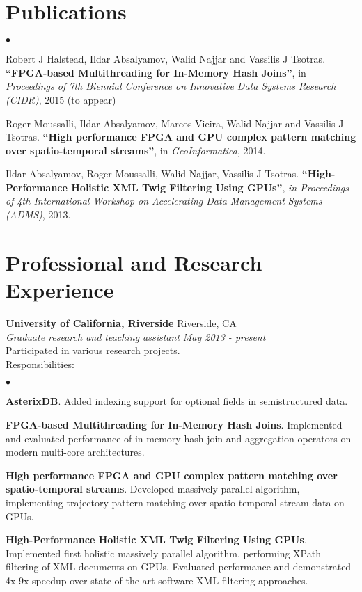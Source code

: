 \documentclass[margin,line]{res}
\newenvironment{list2}{
  \begin{list}{$\bullet$}{%
      \setlength{\itemsep}{0in}
      \setlength{\parsep}{0in} \setlength{\parskip}{0in}
      \setlength{\topsep}{0in} \setlength{\partopsep}{0in} 
      \setlength{\leftmargin}{0.2in}}}{\end{list}}
\begin{document}
\begin{resume}
\section{\sc Publications}
\begin{list2}
	\item Robert J Halstead, Ildar Absalyamov, Walid Najjar and Vassilis J Tsotras. {\bf ``FPGA-based Multithreading for In-Memory Hash Joins''}, in {\it Proceedings of 7th Biennial Conference on Innovative Data Systems Research (CIDR)}, 2015 (to appear)
	\item Roger Moussalli, Ildar Absalyamov, Marcos Vieira, Walid Najjar and Vassilis J Tsotras. {\bf ``High performance FPGA and GPU complex pattern matching over spatio-temporal streams''}, in {\it GeoInformatica}, 2014. 
	\item Ildar Absalyamov, Roger Moussalli, Walid Najjar, Vassilis J Tsotras. {\bf ``High-Performance Holistic XML Twig Filtering Using GPUs''}, { \it in Proceedings of 4th International Workshop on Accelerating Data Management Systems (ADMS)}, 2013.
\end{list2}
% 
% 

\section{\sc Professional and Research Experience}

{\bf University of California, Riverside } \hfill { Riverside, CA } \\
{\em Graduate research and teaching assistant } \hfill {\it May 2013 - present}\\
Participated in various research projects. \\
Responsibilities:
\begin{list2}
	\item {\bf AsterixDB}. Added indexing support for optional fields in semistructured data.
	\item {\bf FPGA-based Multithreading for In-Memory Hash Joins}. Implemented and evaluated performance of in-memory hash join and aggregation operators on modern multi-core architectures.
	\item {\bf High performance FPGA and GPU complex pattern matching over spatio-temporal streams}. Developed massively parallel algorithm, implementing trajectory pattern matching over spatio-temporal stream data on GPUs.
	\item {\bf High-Performance Holistic XML Twig Filtering Using GPUs}. Implemented first holistic massively parallel algorithm, performing XPath filtering of XML documents on GPUs. Evaluated performance and demonstrated 4x-9x speedup over state-of-the-art software XML filtering approaches.
\end{list2}


\end{resume}
\end{document}
